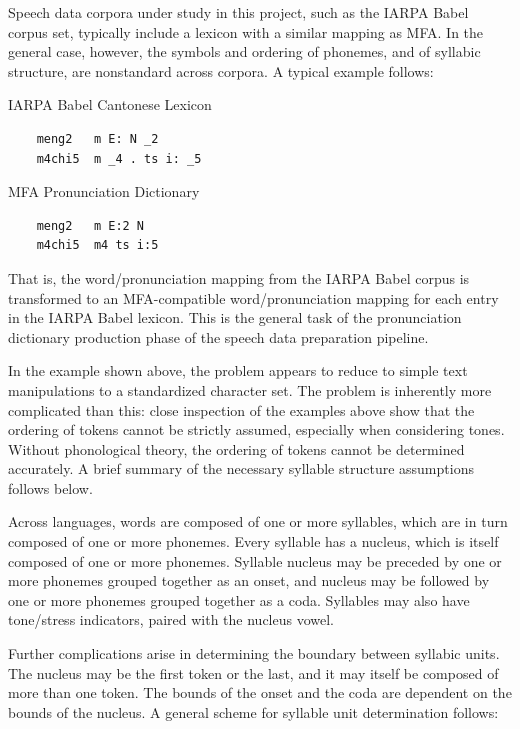\documentclass[11pt]{article}
\begin{document}
Speech data corpora under study in this project, such as the IARPA Babel corpus set, typically include a lexicon with a similar mapping as MFA. In the general case, however, the symbols and ordering of phonemes, and of syllabic structure, are nonstandard across corpora. A typical example follows:

\begin{multicols}{2}
  \begin{singlespace}
    IARPA Babel Cantonese Lexicon
    \begin{verbatim}
    meng2	m E: N _2
    m4chi5	m _4 . ts i: _5
    \end{verbatim}
  \end{singlespace}
  \begin{singlespace}
    MFA Pronunciation Dictionary
    \begin{verbatim}
    meng2	m E:2 N
    m4chi5	m4 ts i:5
    \end{verbatim}
  \end{singlespace}
\end{multicols}

That is, the word/pronunciation mapping from the IARPA Babel corpus is transformed to an MFA-compatible word/pronunciation mapping for each entry in the IARPA Babel lexicon. This is the general task of the pronunciation dictionary production phase of the speech data preparation pipeline.

In the example shown above, the problem appears to reduce to simple text manipulations to a standardized character set. The problem is inherently more complicated than this: close inspection of the examples above show that the ordering of tokens cannot be strictly assumed, especially when considering tones. Without phonological theory, the ordering of tokens cannot be determined accurately. A brief summary of the necessary syllable structure assumptions follows below.

Across languages, words are composed of one or more syllables, which are in turn composed of one or more phonemes. Every syllable has a nucleus, which is itself composed of one or more phonemes. Syllable nucleus may be preceded by one or more phonemes grouped together as an onset, and nucleus may be followed by one or more phonemes grouped together as a coda. Syllables may also have tone/stress indicators, paired with the nucleus vowel.\cite{fromkin_introduction_2006}

Further complications arise in determining the boundary between syllabic units. The nucleus may be the first token or the last, and it may itself be composed of more than one token. The bounds of the onset and the coda are dependent on the bounds of the nucleus. A general scheme for syllable unit determination follows:
\end{document}
